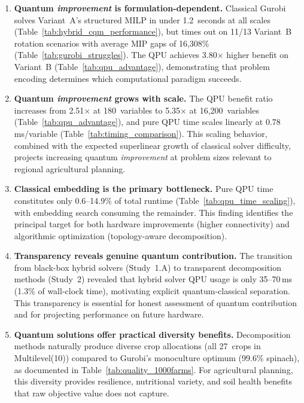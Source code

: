 \begin{enumerate}
    \item \textbf{Quantum \textit{improvement} is formulation-dependent.} Classical Gurobi solves Variant~A's structured MILP in under 1.2~seconds at all scales (Table~\ref{tab:hybrid_cqm_performance}), but times out on 11/13 Variant~B rotation scenarios with average MIP gaps of 16,308\% (Table~\ref{tab:gurobi_struggles}). The QPU achieves 3.80$\times$ higher benefit on Variant~B (Table~\ref{tab:qpu_advantage}), demonstrating that problem encoding determines which computational paradigm succeeds.
    
    \item \textbf{Quantum \textit{improvement} grows with scale.} The QPU benefit ratio increases from 2.51$\times$ at 180~variables to 5.35$\times$ at 16,200~variables (Table~\ref{tab:qpu_advantage}), and pure QPU time scales linearly at 0.78\,ms/variable (Table~\ref{tab:timing_comparison}). This scaling behavior, combined with the expected superlinear growth of classical solver difficulty, projects increasing quantum \textit{improvement} at problem sizes relevant to regional agricultural planning.
    
    \item \textbf{Classical embedding is the primary bottleneck.} Pure QPU time constitutes only 0.6--14.9\% of total runtime (Table~\ref{tab:qpu_time_scaling}), with embedding search consuming the remainder. This finding identifies the principal target for both hardware improvements (higher connectivity) and algorithmic optimization (topology-aware decomposition).
    
    \item \textbf{Transparency reveals genuine quantum contribution.} The transition from black-box hybrid solvers (Study~1.A) to transparent decomposition methods (Study~2) revealed that hybrid solver QPU usage is only 35--70\,ms (1.3\% of wall-clock time), motivating explicit quantum-classical separation. This transparency is essential for honest assessment of quantum contribution and for projecting performance on future hardware.
    
    \item \textbf{Quantum solutions offer practical diversity benefits.} Decomposition methods naturally produce diverse crop allocations (all 27~crops in Multilevel(10)) compared to Gurobi's monoculture optimum (99.6\% spinach), as documented in Table~\ref{tab:quality_1000farms}. For agricultural planning, this diversity provides resilience, nutritional variety, and soil health benefits that raw objective value does not capture.
    

\end{enumerate}
